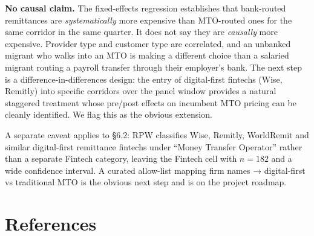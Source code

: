 \documentclass[
  11pt,
]{article}
\begin{document}
\textbf{No causal claim.} The fixed-effects regression establishes that
bank-routed remittances are \emph{systematically} more expensive than
MTO-routed ones for the same corridor in the same quarter. It does not
say they are \emph{causally} more expensive. Provider type and customer
type are correlated, and an unbanked migrant who walks into an MTO is
making a different choice than a salaried migrant routing a payroll
transfer through their employer's bank. The next step is a
difference-in-differences design: the entry of digital-first fintechs
(Wise, Remitly) into specific corridors over the panel window provides a
natural staggered treatment whose pre/post effects on incumbent MTO
pricing can be cleanly identified. We flag this as the obvious
extension.

A separate caveat applies to §6.2: RPW classifies Wise, Remitly,
WorldRemit and similar digital-first remittance fintechs under ``Money
Transfer Operator'' rather than a separate Fintech category, leaving the
Fintech cell with \(n = 182\) and a wide confidence interval. A curated
allow-list mapping firm names → digital-first vs traditional MTO is the
obvious next step and is on the project roadmap.

\section{References}\label{references}
\end{document}
